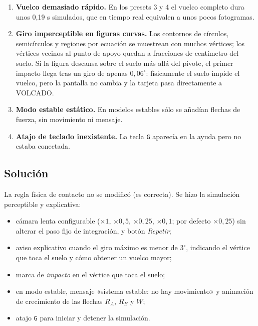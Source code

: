 \documentclass[11pt,a4paper]{article}
\begin{document}
\begin{enumerate}
  \item \textbf{Vuelco demasiado rápido.} En los presets 3 y 4 el vuelco completo dura unos 0,19 s
        simulados, que en tiempo real equivalen a unos pocos fotogramas.
  \item \textbf{Giro imperceptible en figuras curvas.} Los contornos de círculos, semicírculos y regiones
        por ecuación se muestrean con muchos vértices; los vértices vecinos al punto de apoyo quedan a
        fracciones de centímetro del suelo. Si la figura descansa sobre el suelo más allá del pivote, el
        primer impacto llega tras un giro de apenas $0{,}06^\circ$: físicamente el suelo impide el vuelco,
        pero la pantalla no cambia y la tarjeta pasa directamente a VOLCADO.
  \item \textbf{Modo estable estático.} En modelos estables sólo se añadían flechas de fuerza, sin
        movimiento ni mensaje.
  \item \textbf{Atajo de teclado inexistente.} La tecla \texttt{G} aparecía en la ayuda pero no estaba conectada.
\end{enumerate}

\subsection{Solución}
La regla física de contacto no se modificó (es correcta). Se hizo la simulación perceptible y explicativa:
\begin{itemize}
  \item cámara lenta configurable ($\times1$, $\times0{,}5$, $\times0{,}25$, $\times0{,}1$; por defecto
        $\times0{,}25$) sin alterar el paso fijo de integración, y botón \emph{Repetir};
  \item aviso explicativo cuando el giro máximo es menor de $3^\circ$, indicando el vértice que toca el suelo y
        cómo obtener un vuelco mayor;
  \item marca de \emph{impacto} en el vértice que toca el suelo;
  \item en modo estable, mensaje «sistema estable: no hay movimiento» y animación de crecimiento de las
        flechas $R_A$, $R_B$ y $W$;
  \item atajo \texttt{G} para iniciar y detener la simulación.
\end{itemize}

\end{document}
